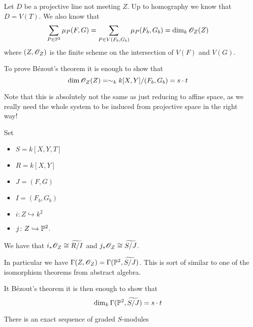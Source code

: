Let $D$ be a projective line not meeting $Z$. Up to homography we know that $D=V(T)$. We also know that 
\begin{equation*}
    \sum_{P\in\P^2}\mu_P(F, G) = \sum_{P\in V(F_b, G_b)} \mu_P(F_b, G_b) = \dim_k \O_Z (Z)
\end{equation*}
where $(Z, \O_Z)$ is the finite scheme on the intersection of $V(F)$ and $V(G)$.

To prove Bézout's theorem it is enough to show that 
\begin{equation*}
    \dim \O_Z(Z) = \sim_k k[X, Y]/(F_b, G_b) = s\cdot t
\end{equation*}

Note that this is absolutely not the same as just reducing to affine space, as we really need the whole system to be induced from projective space in the right way!

Set 
\begin{itemize}
    \item $S = k[X, Y, T]$
    \item $R = k[X, Y]$
    \item $J = (F,G)$
    \item $I = (F_b, G_b)$
    \item $i\colon Z\hookrightarrow k^2$
    \item $j\colon Z\hookrightarrow \P^2$. 
\end{itemize}

\begin{proposition}
We have that $i_*\O_Z\cong \widetilde{R/I}$ and $j_*\O_Z \cong \widetilde{S/J}$. 
\end{proposition}

In particular we have $\Gamma(Z, \O_Z)=\Gamma(\P^2, \widetilde{S/J})$. This is sort of similar to one of the isomorphism theorems from abstract algebra. 

It Bézout's theorem it is then enough to show that
\begin{equation*}
    \dim_k \Gamma(\P^2, \widetilde{S/J}) = s\cdot t
\end{equation*}

\begin{lemma}
There is an exact sequence of graded $S$-modules 
\begin{center}
\end{center}
\end{lemma}

